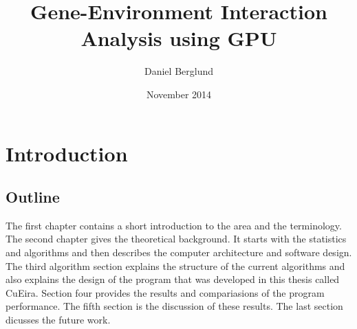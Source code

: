 \documentclass[10pt,a4paper]{report}
\title{Gene-Environment Interaction Analysis using GPU}
\author{Daniel Berglund}
\date{November 2014}
\makeatletter
\newcommand\ackname{Acknowledgements}
\newenvironment{acknowledgements}{
      \titlepage
      \null\vfil
      \@beginparpenalty\@lowpenalty
      \begin{center}%
        \bfseries \ackname
        \@endparpenalty\@M
      \end{center}}%
     {\par\vfil\null\endtitlepage}
\newenvironment{acknowledgements}{
      \if@twocolumn
        \section*{\abstractname}
      \else
        \small
        \begin{center}
          {\bfseries \ackname\vspace{-.5em}\vspace{\z@}}
        \end{center}
        \quotation
      \fi}
      {\if@twocolumn\else\endquotation\fi}
\makeatother
\begin{document}
\maketitle
\thispagestyle{empty}

\clearpage
\thispagestyle{empty}
\begin{abstract}

\end{abstract}

\clearpage
\thispagestyle{empty}
\begin{abstract}

\end{abstract}


\clearpage
\tableofcontents
\thispagestyle{empty}

\clearpage
\setcounter{page}{1}
\chapter{Introduction}

\section{Outline}
The first chapter contains a short introduction to the area and the terminology. The second chapter gives the theoretical background. It starts with the statistics and algorithms and then describes the computer architecture and software design. The third algorithm section explains the structure of the current algorithms and also explains the design of the program that was developed in this thesis called CuEira. Section four provides the results and compariasions of the program performance. The fifth section is the discussion of these results. The last section dicusses the future work.


\end{document}
